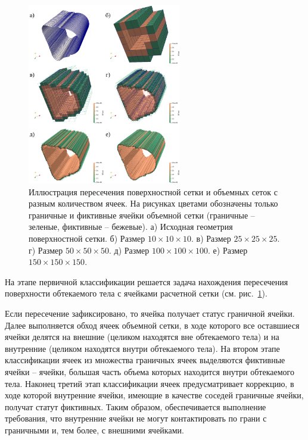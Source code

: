 \begin{figure}[ht]
\centering
\includegraphics[width=0.6\textwidth]{./pics/text_1_immersed_boundary_method/contour.png}
\singlespacing
{}\caption{Иллюстрация пересечения поверхностной сетки и объемных сеток с разным количеством ячеек. На рисунках цветами обозначены только граничные и фиктивные ячейки объемной сетки (граничные -- зеленые, фиктивные -- бежевые). а) Исходная геометрия поверхностной сетки. б) Размер $10 \times 10 \times 10$. в) Размер $25 \times 25 \times 25$. г) Размер $50 \times 50 \times 50$. д) Размер $100 \times 100 \times 100$. е) Размер $150 \times 150 \times 150$.}
\label{fig:text_1_mesh_intersect_contour}
\end{figure}

На этапе первичной классификации решается задача нахождения пересечения поверхности обтекаемого тела с ячейками расчетной сетки \cite{Rybakov2019VecInt} (см. рис.~\ref{fig:text_1_mesh_intersect_contour}).

Если пересечение зафиксировано, то ячейка получает статус граничной ячейки.
Далее выполняется обход ячеек объемной сетки, в ходе которого все оставшиеся ячейки делятся на внешние (целиком находятся вне обтекаемого тела) и на внутренние (целиком находятся внутри обтекаемого тела).
На втором этапе классификации ячеек из множества граничных ячеек выделяются фиктивные ячейки -- ячейки, большая часть объема которых находится внутри обтекаемого тела.
Наконец третий этап классификации ячеек предусматривает коррекцию, в ходе которой внутренние ячейки, имеющие в качестве соседей граничные ячейки, получат статут фиктивных.
Таким образом, обеспечивается выполнение требования, что внутренние ячейки не могут контактировать по грани с граничными и, тем более, с внешними ячейками.

